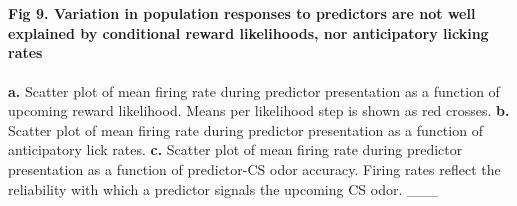 \documentclass[11pt]{article}
\begin{document}
    \begin{center}
    \end{center}
    { \hspace*{\fill} \\}
    
    \paragraph{Fig 9. Variation in population responses to predictors are
not well explained by conditional reward likelihoods, nor anticipatory
licking
rates}\label{fig-9.-variation-in-population-responses-to-predictors-are-not-well-explained-by-conditional-reward-likelihoods-nor-anticipatory-licking-rates}

\textbf{a.} Scatter plot of mean firing rate during predictor
presentation as a function of upcoming reward likelihood. Means per
likelihood step is shown as red crosses. \textbf{b.} Scatter plot of
mean firing rate during predictor presentation as a function of
anticipatory lick rates. \textbf{c.} Scatter plot of mean firing rate
during predictor presentation as a function of predictor-CS odor
accuracy. Firing rates reflect the reliability with which a predictor
signals the upcoming CS odor. \_\_\_
\end{document}
